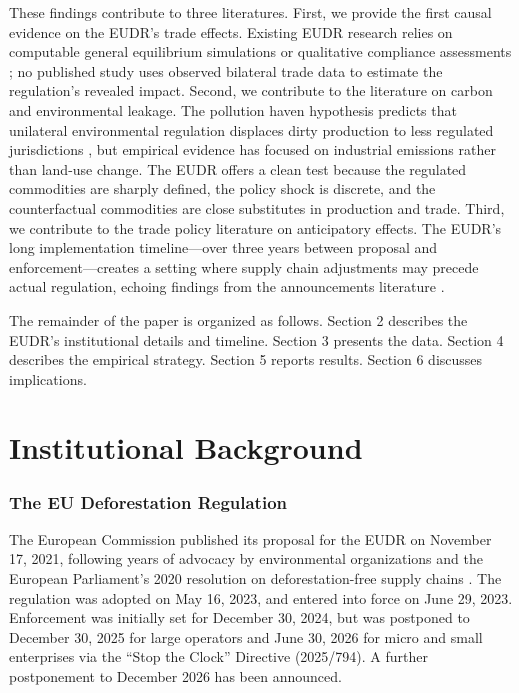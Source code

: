 \documentclass[12pt]{article}
\begin{document}
These findings contribute to three literatures. First, we provide the first causal evidence on the EUDR's trade effects. Existing EUDR research relies on computable general equilibrium simulations \citep{Bager2024, Busch2022} or qualitative compliance assessments \citep{Pendrill2022}; no published study uses observed bilateral trade data to estimate the regulation's revealed impact. Second, we contribute to the literature on carbon and environmental leakage. The pollution haven hypothesis predicts that unilateral environmental regulation displaces dirty production to less regulated jurisdictions \citep{Copeland2004, Levinson2008}, but empirical evidence has focused on industrial emissions \citep{Aichele2015, FowlieReguant2022} rather than land-use change. The EUDR offers a clean test because the regulated commodities are sharply defined, the policy shock is discrete, and the counterfactual commodities are close substitutes in production and trade. Third, we contribute to the trade policy literature on anticipatory effects. The EUDR's long implementation timeline---over three years between proposal and enforcement---creates a setting where supply chain adjustments may precede actual regulation, echoing findings from the announcements literature \citep{Mian2012, Autor2024}.

The remainder of the paper is organized as follows. Section 2 describes the EUDR's institutional details and timeline. Section 3 presents the data. Section 4 describes the empirical strategy. Section 5 reports results. Section 6 discusses implications.


\section{Institutional Background}

\subsubsection*{The EU Deforestation Regulation} The European Commission published its proposal for the EUDR on November 17, 2021, following years of advocacy by environmental organizations and the European Parliament's 2020 resolution on deforestation-free supply chains \citep{EUParliament2020}. The regulation was adopted on May 16, 2023, and entered into force on June 29, 2023. Enforcement was initially set for December 30, 2024, but was postponed to December 30, 2025 for large operators and June 30, 2026 for micro and small enterprises via the ``Stop the Clock'' Directive (2025/794). A further postponement to December 2026 has been announced.
\end{document}
